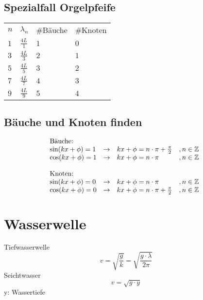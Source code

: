 \subsection{Spezialfall Orgelpfeife}
\begin{tabular}{@{}llll}
\rowcolor{white} $n$ & $\lambda_n$     & \#Bäuche & \#Knoten  \\
\rowcolor{lgray} $1$ & $\frac{4 L}{1}$ & $1$      & $0$       \\
\rowcolor{white} $3$ & $\frac{4 L}{3}$ & $2$      & $1$       \\
\rowcolor{lgray} $5$ & $\frac{4 L}{5}$ & $3$      & $2$       \\
\rowcolor{white} $7$ & $\frac{4 L}{7}$ & $4$      & $3$       \\
\rowcolor{lgray} $9$ & $\frac{4 L}{9}$ & $5$      & $4$       \\
\end{tabular}

\subsection{Bäuche und Knoten finden}
\[ \begin{array}{@{}llll}
\text{Bäuche:} \\
\sin(k x + \phi) = 1 
    & \rightarrow 
    & k x + \phi = n \cdot \pi + \frac{\pi}{2} 
    & , n \in \mathbb{Z} \\
\cos(k x + \phi) = 1 
    & \rightarrow 
    & k x + \phi = n \cdot \pi                 
    & , n \in \mathbb{Z} \\\\
\text{Knoten:} \\
\sin(k x + \phi) = 0 
    & \rightarrow 
    & k x + \phi = n \cdot \pi                 
    & , n \in \mathbb{Z} \\
\cos(k x + \phi) = 0 
    & \rightarrow 
    & k x + \phi = n \cdot \pi + \frac{\pi}{2} 
    & , n \in \mathbb{Z} \\
\end{array} \]

\section{Wasserwelle}
Tiefwasserwelle
\[ \boxed{v = \sqrt{\frac{g}{k}} = \sqrt{\frac{g \cdot \lambda}{2 \pi}}} \]
Seichtwasser
\[ \boxed{v = \sqrt{g \cdot y}} \]
y: Wassertiefe
